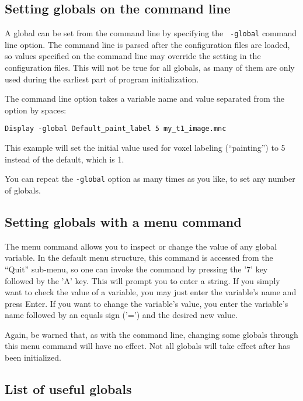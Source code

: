 \subsection{Setting globals on the command line}

A global can be set from the command line by specifying the {\tt
 -global} command line option. The command line is parsed after the
configuration files are loaded, so values specified on the command
line may override the setting in the configuration files. This will
not be true for all globals, as many of them are only used during the
earliest part of program initialization.

The command line option takes a variable name and value separated from
the option by spaces:
\begin{verbatim}
Display -global Default_paint_label 5 my_t1_image.mnc
\end{verbatim}
This example will set the initial value used for voxel labeling (``painting'') to 5 instead of the default, which is 1.

You can repeat the {\tt -global} option as many times as you like, to
set any number of globals.

\subsection{Setting globals with a menu command}

The  menu command allows you to inspect or
change the value of any global variable. In the default menu structure,
this command is accessed from the ``Quit'' sub-menu, so one can invoke
the command by pressing the '7' key followed by the 'A' key. This will
prompt you to enter a string. If you simply want to check the value of a
variable, you may just enter the variable's name and press Enter. If you
want to change the variable's value, you enter the variable's name
followed by an equals sign ('=') and the desired new value.

Again, be warned that, as with the command line, changing some globals
through this menu command will have no effect. Not all globals will take 
effect after \display{} has been initialized.

\subsection{List of useful globals}

